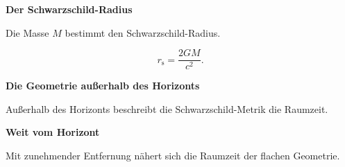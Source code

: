 \begin{frame}[t]
\par\medskip\noindent\textbf{Der Schwarzschild-Radius}\par


Die Masse $M$ bestimmt den Schwarzschild-Radius.


\par\pause

\[
r_\mathrm{s} = \frac{2GM}{c^2}.
\]

\par\medskip\noindent\textbf{Die Geometrie außerhalb des Horizonts}\par


Außerhalb des Horizonts beschreibt die Schwarzschild-Metrik die Raumzeit.

\par\medskip\noindent\textbf{Weit vom Horizont}\par


Mit zunehmender Entfernung nähert sich die Raumzeit der flachen Geometrie.

\end{frame}

